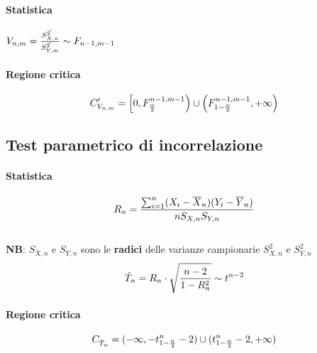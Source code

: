 \documentclass[12pt]{article}
\begin{document}
    \paragraph{Statistica} $V_{n, m} = {\hat{S^2_{X,n}} \over \hat{S^2_{Y,m}}} \sim F_{n-1, m-1}$
    \paragraph{Regione critica}
    $$C_{V_{n,m}}' = \left[0, F_{\alpha \over 2}^{n-1,m-1} \right) \cup \left(F_{1 - {\alpha \over 2}}^{n-1,m-1}, +\infty\right)$$ 

    \subsection{Test parametrico di incorrelazione }
    \paragraph{Statistica} $$R_n = {{\sum_{i=1}^n(X_i - \overline{X}_n)(Y_i - \overline{Y}_n)}\over{nS_{X,n}S_{Y,n}}}$$
    \\\textbf{NB}: $S_{X,n}$ e $S_{Y,n}$ sono le \textbf{radici} delle varianze campionarie $S_{X,n}^2$ e $S_{Y,n}^2$
    $$\hat{T}_n = R_n \cdot \sqrt{{n-2}\over{1- R_n^2}} \sim t^{n-2}$$
    \paragraph{Regione critica}
    $$C_{\hat{T}_n} = (-\infty, -t_{1-{\alpha \over 2}}^n-2) \cup (t_{1-{\alpha \over 2}}^n-2, +\infty)$$
\end{document}
